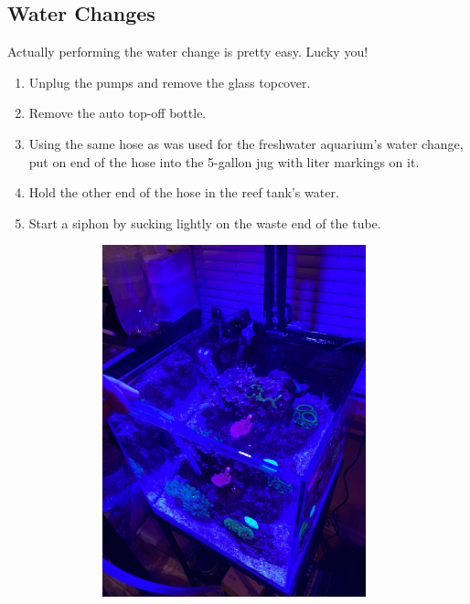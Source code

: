 \documentclass{report}
\begin{document}
\subsection{Water Changes}
\label{sec:reefwc}
Actually performing the water change is pretty easy. Lucky you!
\begin{enumerate}
    \item Unplug the pumps and remove the glass topcover.
    \item Remove the auto top-off bottle.
    \item Using the same hose as was used for the freshwater aquarium's water change, put on end of the hose into the 
    5-gallon jug with liter markings on it.
    \item Hold the other end of the hose in the reef tank's water.
    \item Start a siphon by sucking lightly on the waste end of the tube.
    \begin{figure}[H]
        \centering
        \begin{subfigure}{0.5\textwidth}
            \centering
            \includegraphics[width=0.9\textwidth, angle=-90]{EmptyingAquarium.jpg}

\end{subfigure}
\end{figure}
\end{enumerate}
\end{document}
